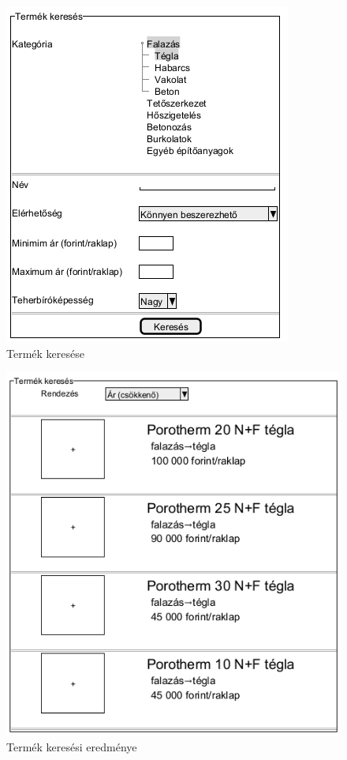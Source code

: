 \begin{figure}[h]
	\centering
	\includegraphics[scale=0.5]{img/termek_keres.png}
	\caption*{Termék keresése}
	\label{fig:term_ker}
\end{figure}

\begin{figure}[h]
	\centering
	\includegraphics[scale=0.4]{img/termek_eredmeny.png}
	\caption*{Termék keresési eredménye}
	\label{fig:term_ker_ered}
\end{figure}

